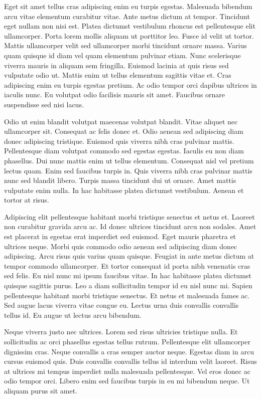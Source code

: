 \documentclass[11pt,a4paper]{article}
\begin{document}
Eget sit amet tellus cras adipiscing enim eu turpis egestas. Malesuada bibendum arcu vitae elementum curabitur vitae. Ante metus dictum at tempor. Tincidunt eget nullam non nisi est. Platea dictumst vestibulum rhoncus est pellentesque elit ullamcorper. Porta lorem mollis aliquam ut porttitor leo. Fusce id velit ut tortor. Mattis ullamcorper velit sed ullamcorper morbi tincidunt ornare massa. Varius quam quisque id diam vel quam elementum pulvinar etiam. Nunc scelerisque viverra mauris in aliquam sem fringilla. Euismod lacinia at quis risus sed vulputate odio ut. Mattis enim ut tellus elementum sagittis vitae et. Cras adipiscing enim eu turpis egestas pretium. Ac odio tempor orci dapibus ultrices in iaculis nunc. Eu volutpat odio facilisis mauris sit amet. Faucibus ornare suspendisse sed nisi lacus.

Odio ut enim blandit volutpat maecenas volutpat blandit. Vitae aliquet nec ullamcorper sit. Consequat ac felis donec et. Odio aenean sed adipiscing diam donec adipiscing tristique. Euismod quis viverra nibh cras pulvinar mattis. Pellentesque diam volutpat commodo sed egestas egestas. Iaculis eu non diam phasellus. Dui nunc mattis enim ut tellus elementum. Consequat nisl vel pretium lectus quam. Enim sed faucibus turpis in. Quis viverra nibh cras pulvinar mattis nunc sed blandit libero. Turpis massa tincidunt dui ut ornare. Amet mattis vulputate enim nulla. In hac habitasse platea dictumst vestibulum. Aenean et tortor at risus.

Adipiscing elit pellentesque habitant morbi tristique senectus et netus et. Laoreet non curabitur gravida arcu ac. Id donec ultrices tincidunt arcu non sodales. Amet est placerat in egestas erat imperdiet sed euismod. Eget mauris pharetra et ultrices neque. Morbi quis commodo odio aenean sed adipiscing diam donec adipiscing. Arcu risus quis varius quam quisque. Feugiat in ante metus dictum at tempor commodo ullamcorper. Et tortor consequat id porta nibh venenatis cras sed felis. Eu nisl nunc mi ipsum faucibus vitae. In hac habitasse platea dictumst quisque sagittis purus. Leo a diam sollicitudin tempor id eu nisl nunc mi. Sapien pellentesque habitant morbi tristique senectus. Et netus et malesuada fames ac. Sed augue lacus viverra vitae congue eu. Lectus urna duis convallis convallis tellus id. Eu augue ut lectus arcu bibendum.

Neque viverra justo nec ultrices. Lorem sed risus ultricies tristique nulla. Et sollicitudin ac orci phasellus egestas tellus rutrum. Pellentesque elit ullamcorper dignissim cras. Neque convallis a cras semper auctor neque. Egestas diam in arcu cursus euismod quis. Duis convallis convallis tellus id interdum velit laoreet. Risus at ultrices mi tempus imperdiet nulla malesuada pellentesque. Vel eros donec ac odio tempor orci. Libero enim sed faucibus turpis in eu mi bibendum neque. Ut aliquam purus sit amet.
\end{document}
